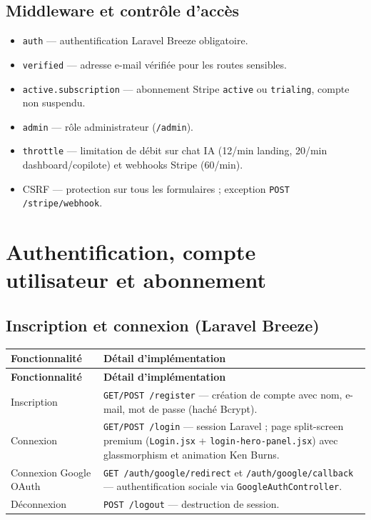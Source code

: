 \documentclass[11pt,a4paper]{report}
\newcommand{\route}[1]{\texttt{\small #1}}
\newcommand{\ctrl}[1]{\texttt{\small #1}}
\begin{document}
\section{Middleware et contrôle d'accès}

\begin{itemize}[leftmargin=*]
    \item \texttt{auth} — authentification Laravel Breeze obligatoire.
    \item \texttt{verified} — adresse e-mail vérifiée pour les routes sensibles.
    \item \texttt{active.subscription} — abonnement Stripe \texttt{active} ou \texttt{trialing}, compte non suspendu.
    \item \texttt{admin} — rôle administrateur (\route{/admin}).
    \item \texttt{throttle} — limitation de débit sur chat IA (12/min landing, 20/min dashboard/copilote) et webhooks Stripe (60/min).
    \item CSRF — protection sur tous les formulaires ; exception \route{POST /stripe/webhook}.
\end{itemize}

\chapter{Authentification, compte utilisateur et abonnement}

\section{Inscription et connexion (Laravel Breeze)}

\begin{longtable}{@{}p{3.2cm}p{10.5cm}@{}}
\toprule
\textbf{Fonctionnalité} & \textbf{Détail d'implémentation} \\
\midrule
\endfirsthead
\toprule
\textbf{Fonctionnalité} & \textbf{Détail d'implémentation} \\
\midrule
\endhead
Inscription & \route{GET/POST /register} — création de compte avec nom, e-mail, mot de passe (haché Bcrypt). \\
Connexion & \route{GET/POST /login} — session Laravel ; page split-screen premium (\texttt{Login.jsx} + \texttt{login-hero-panel.jsx}) avec glassmorphism et animation Ken Burns. \\
Connexion Google OAuth & \route{GET /auth/google/redirect} et \route{/auth/google/callback} — authentification sociale via \ctrl{GoogleAuthController}. \\
Déconnexion & \route{POST /logout} — destruction de session. \\
\bottomrule
\end{longtable}
\end{document}
